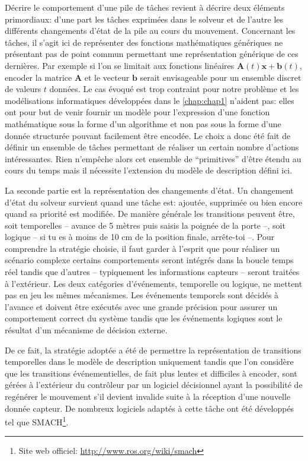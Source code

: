 Décrire le comportement d'une pile de tâches
revient à décrire deux éléments primordiaux: d'une part les tâches
exprimées dans le solveur et de l'autre les différents changements
d'état de la pile au cours du mouvement. Concernant les
tâches, il s'agit ici de représenter des fonctions
mathématiques génériques ne présentant pas de point commun permettant
une représentation générique de ces dernières. Par exemple si l'on se
limitait aux fonctions linéaires $\mathbf{A}(t) \mathbf{x} +
\mathbf{b}(t)$, encoder la matrice $\mathbf{A}$ et le vecteur
$\mathbf{b}$ serait envisageable pour un ensemble discret de valeurs
$t$ données. Le cas évoqué est trop contraint pour notre problème et
les modélisations informatiques développées dans le
\autoref{chap:chap1} n'aident pas: elles ont pour but de venir fournir
un modèle pour l'expression d'une fonction mathématique sous la forme
d'un algorithme et non pas sous la forme d'une donnée structurée
pouvant facilement être encodée. Le choix a donc été fait de définir
un ensemble de tâches permettant de réaliser un certain nombre
d'actions intéressantes. Rien n'empêche alors cet ensemble de
``primitives'' d'être étendu au cours du temps mais il nécessite
l'extension du modèle de description défini ici.


La seconde partie est la représentation des changements d'état. Un
changement d'état du solveur survient quand une tâche est: ajoutée,
supprimée ou bien encore quand sa priorité est modifiée. De manière
générale les transitions peuvent être, soit temporelles -- avance de 5
mètres puis saisis la poignée de la porte --, soit logique -- si tu es
à moins de 10 cm de la position finale, arrête-toi --. Pour comprendre
la stratégie choisie, il faut garder à l'esprit que pour réaliser un
scénario complexe certains comportements seront intégrés dans la
boucle temps réel tandis que d'autres -- typiquement les informations
capteurs -- seront traitées à l'extérieur. Les deux catégories
d'événements, temporelle ou logique, ne mettent pas en jeu les mêmes
mécanismes. Les événements temporels sont décidés à l'avance et
doivent être exécutés avec une grande précision pour assurer un
comportement correct du système tandis que les événements logiques
sont le résultat d'un mécanisme de décision externe.

De ce fait, la stratégie adoptée a été de permettre la représentation
de transitions temporelles dans le modèle de description uniquement
tandis que l'on considère que les transitions événementielles, de fait
plus lentes et difficiles à encoder, sont gérées à l'extérieur du
contrôleur par un logiciel décisionnel ayant la possibilité de
regénérer le mouvement s'il devient invalide suite à la réception
d'une nouvelle donnée capteur. De nombreux logiciels adaptés à cette
tâche ont été développés tel que SMACH\footnote{Site web officiel:
  \url{http://www.ros.org/wiki/smach}}.


